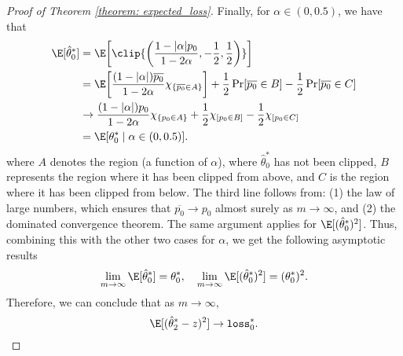 \begin{proof}[Proof of Theorem \ref{theorem: expected_loss}]
Finally, for $\alpha \in (0, 0.5)$, we have that 
\begin{align*}
	\E[\hat{\theta}_0^\ast] &= \E\bigg[\clip{\bigg( \frac{1 - |\alpha| p_0}{1-2\alpha}, -\frac12, \frac12 \bigg)}\bigg]\\
	&= \E\bigg[ \frac{(1-|\alpha|)\overline{p_0}}{1-2\alpha}  \chi_{\{\overline{p_0} \in A\}} \bigg] + \frac12 \Pr[\overline{p_0} \in B  ] - \frac{1}{2} \Pr[\overline{p_0} \in C ]\\
	&\to \frac{(1-|\alpha|){p_0}}{1-2\alpha}  \chi_{\{{p_0} \in A\}} + \frac12 \chi_{[{p_0} \in B  ]} - \frac{1}{2} \chi_{[{p_0} \in C ]}\\
	&= \E[{\theta}_0^\ast \mid \alpha \in (0, 0.5)].
\end{align*}
where $A$ denotes the region (a function of $\alpha$), where $\hat{\theta}_0^\ast$ has not been clipped, $B$ represents the region where it has been clipped from above, and $C$ is the region where it has been clipped from below. The third line follows from: (1) the law of large numbers, which ensures that $\overline{p_0} \to p_0$ almost surely as $m \to \infty$, and (2) the dominated convergence theorem. The same argument applies for $\E[(\hat{\theta}_0^\ast)^2]$. Thus, combining this with the other two cases for $\alpha$, we get the following asymptotic results 
\begin{align*}
\lim_{m \to \infty} \E[\hat{\theta}_0^\ast] = \theta_0^\ast, \quad \lim_{m \to \infty} \E[(\hat{\theta}_0^\ast)^2] = (\theta_0^\ast)^2.
\end{align*}
Therefore, we can conclude that as $m\to \infty$,
\begin{equation*}
\E[(\hat{\theta}_2^\ast - z)^2] \to \verb|loss|_0^\ast.
\end{equation*}
\end{proof}
